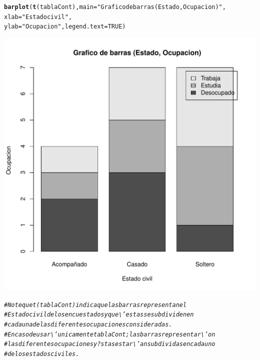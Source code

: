 \documentclass[12pt,letterpaper]{article}\usepackage[]{graphicx}\usepackage[]{color}
\makeatletter
\def\maxwidth{ %
  \ifdim\Gin@nat@width>\linewidth
    \linewidth
  \else
    \Gin@nat@width
  \fi
}
\newcommand{\hlnum}[1]{\textcolor[rgb]{0.686,0.059,0.569}{#1}}%
\newcommand{\hlstr}[1]{\textcolor[rgb]{0.192,0.494,0.8}{#1}}%
\newcommand{\hlcom}[1]{\textcolor[rgb]{0.678,0.584,0.686}{\textit{#1}}}%
\newcommand{\hlstd}[1]{\textcolor[rgb]{0.345,0.345,0.345}{#1}}%
\newcommand{\hlkwc}[1]{\textcolor[rgb]{0.333,0.667,0.333}{#1}}%
\newcommand{\hlkwd}[1]{\textcolor[rgb]{0.737,0.353,0.396}{\textbf{#1}}}%
\newenvironment{kframe}{%
 \def\at@end@of@kframe{}%
 \ifinner\ifhmode%
  \def\at@end@of@kframe{\end{minipage}}%
  \begin{minipage}{\columnwidth}%
 \fi\fi%
 \def\FrameCommand##1{\hskip\@totalleftmargin \hskip-\fboxsep
 \colorbox{shadecolor}{##1}\hskip-\fboxsep
     \hskip-\linewidth \hskip-\@totalleftmargin \hskip\columnwidth}%
 \MakeFramed {\advance\hsize-\width
   \@totalleftmargin\z@ \linewidth\hsize
   \@setminipage}}%
 {\par\unskip\endMakeFramed%
 \at@end@of@kframe}
\newenvironment{knitrout}{}{} %
\makeatother
\begin{document}
\begin{knitrout}
\begin{kframe}
\begin{alltt}
\hlkwd{barplot}\hlstd{(}\hlkwd{t}\hlstd{(tablaCont),} \hlkwc{main}\hlstd{=}\hlstr{"Grafico de barras (Estado, Ocupacion)"}\hlstd{,}
        \hlkwc{xlab}\hlstd{=}\hlstr{"Estado civil"}\hlstd{,}
\hlkwc{ylab}\hlstd{=}\hlstr{"Ocupacion"}\hlstd{,} \hlkwc{legend.text}\hlstd{=}\hlnum{TRUE}\hlstd{)}
\end{alltt}
\end{kframe}
\includegraphics[width=\maxwidth]{figure/unnamed-chunk-6-1} 
\begin{kframe}\begin{alltt}
\hlcom{# Note que t(tablaCont) indica que las barras representan el }
\hlcom{# Estado civil de los encuestados y que \textbackslash{}'estas se subdividen en }
\hlcom{# cada una de las diferentes ocupaciones consideradas.}
\hlcom{# En caso de usar \textbackslash{}'unicamente tablaCont; las barras representar\textbackslash{}'on }
\hlcom{# las diferentes ocupaciones y ?stas estar\textbackslash{}'an subdividas en cada uno }
\hlcom{# de los estados civiles.}


\end{alltt}
\end{kframe}
\end{knitrout}
\end{document}
